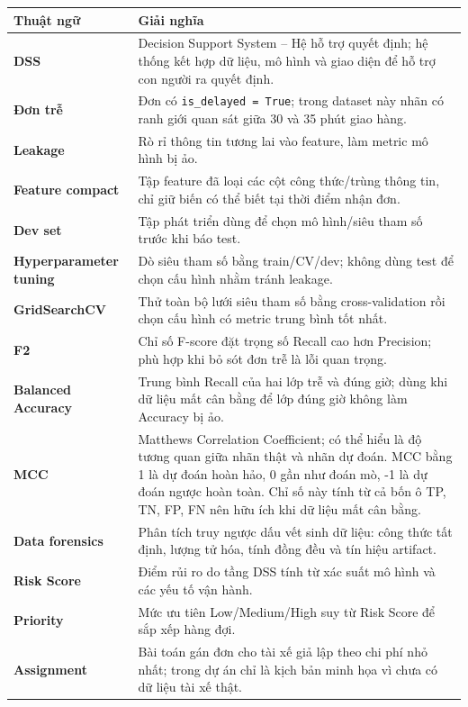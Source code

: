 \documentclass[12pt,a4paper,oneside]{report}
\newcommand{\code}[1]{\nolinkurl{#1}}
\begin{document}
\begin{longtable}{>{\bfseries}p{4.0cm}p{10.2cm}}
\toprule
\textmd{\bfseries Thuật ngữ} & \textbf{Giải nghĩa}\\
\midrule
\endhead
DSS & Decision Support System -- Hệ hỗ trợ quyết định; hệ thống kết hợp dữ
liệu, mô hình và giao diện để hỗ trợ con người ra quyết định.\\
Đơn trễ & Đơn có \code{is\_delayed = True}; trong dataset này nhãn có ranh
giới quan sát giữa 30 và 35 phút giao hàng.\\
Leakage & Rò rỉ thông tin tương lai vào feature, làm metric mô hình bị ảo.\\
Feature compact & Tập feature đã loại các cột công thức/trùng thông tin, chỉ
giữ biến có thể biết tại thời điểm nhận đơn.\\
Dev set & Tập phát triển dùng để chọn mô hình/siêu tham số trước khi báo test.\\
Hyperparameter tuning & Dò siêu tham số bằng train/CV/dev; không dùng test để
chọn cấu hình nhằm tránh leakage.\\
GridSearchCV & Thử toàn bộ lưới siêu tham số bằng cross-validation rồi chọn cấu
hình có metric trung bình tốt nhất.\\
F2 & Chỉ số F-score đặt trọng số Recall cao hơn Precision; phù hợp khi bỏ sót
đơn trễ là lỗi quan trọng.\\
Balanced Accuracy & Trung bình Recall của hai lớp trễ và đúng giờ; dùng khi dữ
liệu mất cân bằng để lớp đúng giờ không làm Accuracy bị ảo.\\
MCC & Matthews Correlation Coefficient; có thể hiểu là độ tương quan giữa nhãn
thật và nhãn dự đoán. MCC bằng 1 là dự đoán hoàn hảo, 0 gần như đoán mò, -1 là
dự đoán ngược hoàn toàn. Chỉ số này tính từ cả bốn ô TP, TN, FP, FN nên hữu ích
khi dữ liệu mất cân bằng.\\
Data forensics & Phân tích truy ngược dấu vết sinh dữ liệu: công thức tất định,
lượng tử hóa, tính đồng đều và tín hiệu artifact.\\
Risk Score & Điểm rủi ro do tầng DSS tính từ xác suất mô hình và các yếu tố
vận hành.\\
Priority & Mức ưu tiên Low/Medium/High suy từ Risk Score để sắp xếp hàng đợi.\\
Assignment & Bài toán gán đơn cho tài xế giả lập theo chi phí nhỏ nhất; trong
dự án chỉ là kịch bản minh họa vì chưa có dữ liệu tài xế thật.\\
\bottomrule
\end{longtable}
\end{document}
